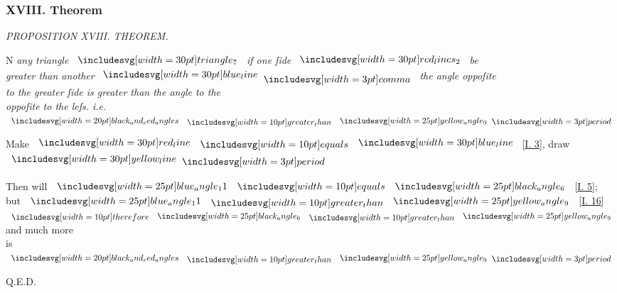 \documentclass[12pt,preview]{standalone}
\begin{document}
\subsubsection{XVIII. Theorem}

\begin{minipage}[t]{0.33\textwidth}
    \vspace{40pt}
    
\end{minipage}%
\hfill
\begin{minipage}[t]{0.64\textwidth}
    \vspace{0pt}

    \begin{center}
        \textit{PROPOSITION XVIII. THEOREM.}\label{book1pr18} \\
    \end{center}

    \hfill

    \begin{center}
        \raggedright \lettrine[lines=4, loversize=1, nindent=0pt]{}{}N \textit{any triangle} $\img[0][0][30]{triangle_7}$ \textit{if one ſide} $\img[0.5][0][30]{red_lines_2}$ \textit{be\\ greater than another} $\blueline \bcomma$ \textit{the angle oppoſite\\ to the greater ſide is greater than the angle to the\\ oppoſite to the leſs. i.e.} $\img[0][0][20]{black_and_red_angles} \bgt \img{yellow_angle_9} \bperiod$
    \end{center}

    \hfill

    \hfill

    {\vspace{1ex}\begin{center}
            Make $\redline \bequals \blueline$ [\hyperref[book1pr3]{\textsc{I.} 3}], draw $\yellowline \bperiod$
        \end{center}}

    \hfill

    \begin{center}
        Then will $\img{blue_angle_11} \bequals \img{black_angle_6}$ [\hyperref[book1pr5]{\textsc{I.} 5}];\\
        but $\img{blue_angle_11} \bgt \img{yellow_angle_9}$ [\hyperref[book1pr16]{\textsc{I.} 16}]\\
        $\btherefore \img{black_angle_6} \bgt \img{yellow_angle_9}$ and much more\\
        is $\img[0][0][20]{black_and_red_angles} \bgt \img{yellow_angle_9} \bperiod$
    \end{center}

    \hfill

    \hfill Q.E.D.
\end{minipage}
\end{document}
